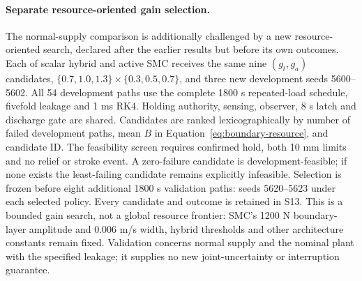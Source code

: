 \paragraph{Separate resource-oriented gain selection.}
The normal-supply comparison is additionally challenged by a new resource-oriented search, declared after the earlier results but before its own outcomes. Each of scalar hybrid and active SMC receives the same nine $(g_t,g_a)$ candidates, $\{0.7,1.0,1.3\}\times\{0.3,0.5,0.7\}$, and three new development seeds 5600--5602. All 54 development paths use the complete 1800 s repeated-load schedule, fivefold leakage and 1 ms RK4. Holding authority, sensing, observer, 8 s latch and discharge gate are shared. Candidates are ranked lexicographically by number of failed development paths, mean $B$ in Equation~\eqref{eq:boundary-resource}, and candidate ID. The feasibility screen requires confirmed hold, both 10 mm limits and no relief or stroke event. A zero-failure candidate is development-feasible; if none exists the least-failing candidate remains explicitly infeasible. Selection is frozen before eight additional 1800 s validation paths: seeds 5620--5623 under each selected policy. Every candidate and outcome is retained in S13. This is a bounded gain search, not a global resource frontier: SMC's 1200 N boundary-layer amplitude and 0.006 m/s width, hybrid thresholds and other architecture constants remain fixed. Validation concerns normal supply and the nominal plant with the specified leakage; it supplies no new joint-uncertainty or interruption guarantee.
